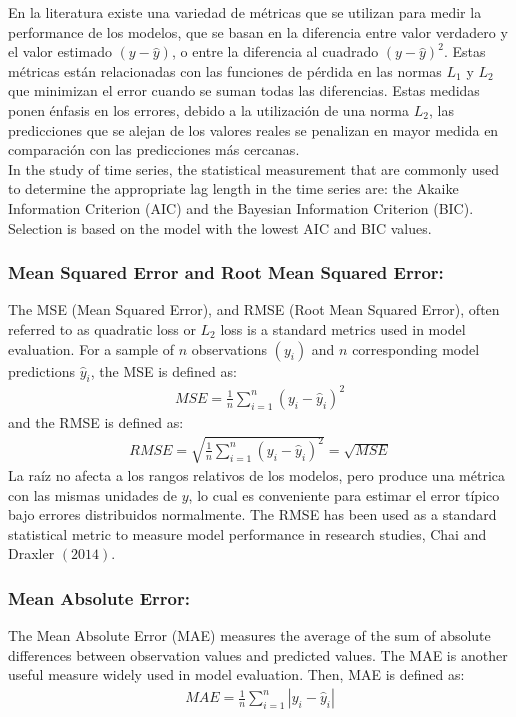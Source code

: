 En la literatura existe una variedad de métricas que se utilizan para medir la performance
de los modelos, que se basan en la diferencia entre valor verdadero y el valor estimado 
$\left(y-\hat{y}\right) $, o entre la diferencia al cuadrado $\left(y-\hat{y}\right)^{2}$.
Estas métricas están relacionadas con las funciones de pérdida en las normas $L_{1}$ y $L_{2}$ que
minimizan el error cuando se suman todas las diferencias. Estas medidas ponen énfasis en
los errores, debido a la utilización de una norma $L_{2}$, las predicciones que se alejan de 
los valores reales se penalizan en mayor medida en comparación con las predicciones más 
cercanas.\\
In the study of time series, the statistical measurement  that are commonly used to determine the appropriate lag length in the time series are: the Akaike Information Criterion (AIC) and the Bayesian Information Criterion (BIC). Selection is based on the model with the lowest AIC and BIC values.
\subsubsection{Mean Squared Error and	Root Mean Squared Error:}
The MSE (Mean Squared Error), and RMSE (Root Mean Squared Error), often referred to as quadratic loss or
$L_{2}$ loss is a standard metrics used in model evaluation. For a sample of $n$ 
observations $(y_{i})$ and $n$ corresponding model predictions $\hat{y}_{i}$,
the  MSE is defined as: 
\begin{align*}
MSE=\frac{1}{n}\sum_{i=1}^{n}\left(y_{i}-\hat{y}_{i}\right)^{2}
\end{align*}
and the RMSE is defined as:
\begin{align*}
RMSE=\sqrt{\frac{1}{n}\sum_{i=1}^{n}\left(y_{i}-\hat{y}_{i}\right)^{2}}=\sqrt{MSE}
\end{align*}
La raíz no afecta a los rangos relativos de los modelos, pero produce una métrica con las 
mismas unidades de $y$, lo cual es conveniente para estimar el error típico bajo errores 
distribuidos normalmente. The RMSE has been used as a standard statistical metric to measure 
model performance in research studies, Chai and Draxler $(2014)$.
\subsubsection{Mean Absolute Error:}
The Mean Absolute Error (MAE) measures the average of the sum of absolute differences between
observation values and predicted values. The MAE is another useful measure widely used in model 
evaluation. Then, MAE is defined as:
\begin{align*}
MAE=\frac{1}{n}\sum_{i=1}^{n}|y_{i}-\hat{y}_{i}|
\end{align*}
